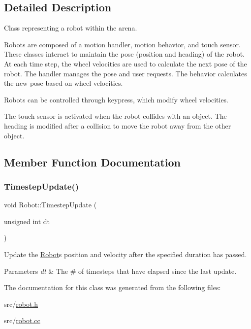 \subsection{Detailed Description}
Class representing a robot within the arena. 

Robots are composed of a motion handler, motion behavior, and touch sensor. These classes interact to maintain the pose (position and heading) of the robot. At each time step, the wheel velocities are used to calculate the next pose of the robot. The handler manages the pose and user requests. The behavior calculates the new pose based on wheel velocities.

Robots can be controlled through keypress, which modify wheel velocities.

The touch sensor is activated when the robot collides with an object. The heading is modified after a collision to move the robot away from the other object. 

\subsection{Member Function Documentation}
\mbox{\label{class_robot_ae790462f8782efcfd26082eedec30ed5}} 
\subsubsection{\texorpdfstring{Timestep\+Update()}{TimestepUpdate()}}
{\footnotesize\ttfamily void Robot\+::\+Timestep\+Update (\begin{DoxyParamCaption}\item[{unsigned int}]{dt }\end{DoxyParamCaption})\hspace{0.3cm}{\ttfamily [override]}}



Update the \mbox{\hyperlink{class_robot}{Robot}}\textquotesingle{}s position and velocity after the specified duration has passed. 


\begin{DoxyParams}{Parameters}
{\em dt} & The \# of timesteps that have elapsed since the last update. \\
\hline
\end{DoxyParams}


The documentation for this class was generated from the following files\+:\begin{DoxyCompactItemize}
\item 
src/\mbox{\hyperlink{robot_8h}{robot.\+h}}\item 
src/\mbox{\hyperlink{robot_8cc}{robot.\+cc}}\end{DoxyCompactItemize}
